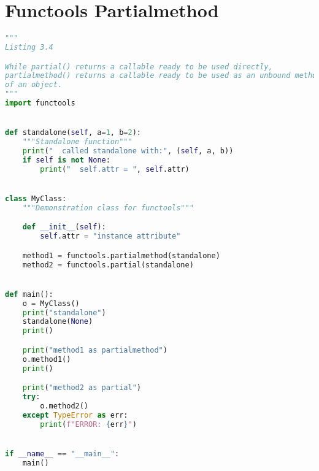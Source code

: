 \documentclass[a4paper,landscape]{report}
\begin{document}
\section{Functools Partialmethod}
\begin{lstlisting}[language=Python]
"""
Listing 3.4

While partial() returns a callable ready to be used directly,
partialmethod() returns a callable ready to be used as an unbound method
of an object.
"""
import functools


def standalone(self, a=1, b=2):
    """Standalone function"""
    print("  called standalone with:", (self, a, b))
    if self is not None:
        print("  self.attr = ", self.attr)


class MyClass:
    """Demonstration class for functools"""

    def __init__(self):
        self.attr = "instance attribute"

    method1 = functools.partialmethod(standalone)
    method2 = functools.partial(standalone)


def main():
    o = MyClass()
    print("standalone")
    standalone(None)
    print()

    print("method1 as partialmethod")
    o.method1()
    print()

    print("method2 as partial")
    try:
        o.method2()
    except TypeError as err:
        print(f"ERROR: {err}")


if __name__ == "__main__":
    main()

\end{lstlisting}
\end{document}

